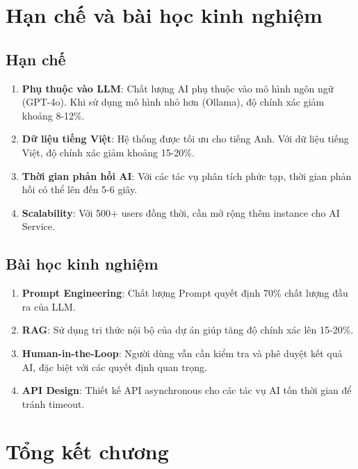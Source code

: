 \documentclass[12pt,a4paper]{report}
\begin{document}
\section{Hạn chế và bài học kinh nghiệm}

\subsection{Hạn chế}

\begin{enumerate}
\item \textbf{Phụ thuộc vào LLM}: Chất lượng AI phụ thuộc vào mô hình ngôn ngữ (GPT-4o). Khi sử dụng mô hình nhỏ hơn (Ollama), độ chính xác giảm khoảng 8-12\%.
\item \textbf{Dữ liệu tiếng Việt}: Hệ thống được tối ưu cho tiếng Anh. Với dữ liệu tiếng Việt, độ chính xác giảm khoảng 15-20\%.
\item \textbf{Thời gian phản hồi AI}: Với các tác vụ phân tích phức tạp, thời gian phản hồi có thể lên đến 5-6 giây.
\item \textbf{Scalability}: Với 500+ users đồng thời, cần mở rộng thêm instance cho AI Service.
\end{enumerate}

\subsection{Bài học kinh nghiệm}

\begin{enumerate}
\item \textbf{Prompt Engineering}: Chất lượng Prompt quyết định 70\% chất lượng đầu ra của LLM.
\item \textbf{RAG}: Sử dụng tri thức nội bộ của dự án giúp tăng độ chính xác lên 15-20\%.
\item \textbf{Human-in-the-Loop}: Người dùng vẫn cần kiểm tra và phê duyệt kết quả AI, đặc biệt với các quyết định quan trọng.
\item \textbf{API Design}: Thiết kế API asynchronous cho các tác vụ AI tốn thời gian để tránh timeout.
\end{enumerate}

\section{Tổng kết chương}
\end{document}
